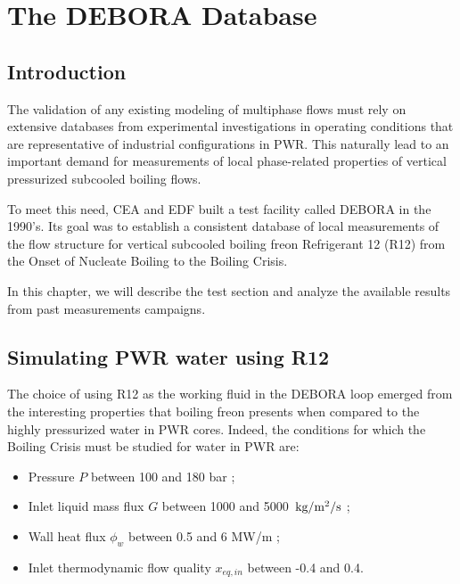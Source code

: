 
\chapter{The DEBORA Database} %

\minitoc

\section{Introduction}

\label{ch:debora} %

The validation of any existing modeling of multiphase flows must rely on extensive databases from experimental investigations in operating conditions that are representative of industrial configurations in PWR. This naturally lead to an important demand for measurements of local phase-related properties of vertical pressurized subcooled boiling flows. 

\npar
To meet this need, CEA and EDF built a test facility called DEBORA in the 1990's. Its goal was to establish a consistent database of local measurements of the flow structure for vertical subcooled boiling freon Refrigerant 12 (R12) from the Onset of Nucleate Boiling to the Boiling Crisis.

\npar

In this chapter, we will describe the test section and analyze the available results from past measurements campaigns.


\section{Simulating PWR water using R12}

The choice of using R12 as the working fluid in the DEBORA loop emerged from the interesting properties that boiling freon presents when compared to the highly pressurized water in PWR cores. Indeed, the conditions for which the Boiling Crisis must be studied for water in PWR are:

\begin{itemize}
\item Pressure $P$ between 100 and 180 bar ;
\item Inlet liquid mass flux $G$ between 1000 and 5000~$\text{kg/m$^{2}$/s}$ ;
\item Wall heat flux $\phi_{w}$ between 0.5 and 6 MW/m ;
\item Inlet thermodynamic flow quality $x_{eq,in}$ between -0.4 and 0.4.
\end{itemize}

